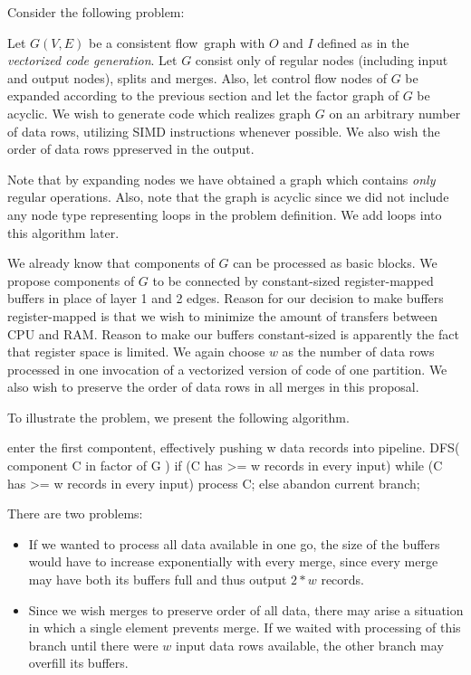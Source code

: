 Consider the following problem:

\begin{problem}
  Let $G(V,E)$ be a consistent flow~graph with $O$ and $I$ defined as in the \emph{vectorized code generation}. Let $G$ consist only of regular nodes (including input and output nodes), splits and merges.  Also, let control flow nodes of $G$ be expanded according to the previous section and let the factor graph of $G$ be acyclic. We wish to generate code which realizes graph $G$ on an arbitrary number of data rows, utilizing SIMD instructions whenever possible. We also wish the order of data rows ppreserved in the output.
\end{problem}

\begin{rem} 
Note that by expanding nodes we have obtained a graph which contains \emph{only} regular operations. Also, note that the graph is acyclic since we did not include any node type representing loops in the problem definition. We add loops into this algorithm later.
\end{rem}

We already know that components of $G$ can be processed as basic blocks. We propose components of $G$ to be connected by constant-sized register-mapped buffers in place of layer 1 and 2 edges. Reason for our decision to make buffers register-mapped is that we wish to minimize the amount of transfers between CPU and RAM. Reason to make our buffers constant-sized is apparently the fact that register space is limited. We again choose $w$ as the number of data rows processed in one invocation of a vectorized version of code of one partition. We also wish to preserve the order of data rows in all merges in this proposal.


To illustrate the problem, we present the following algorithm.

\begin{code}
enter the first compontent, 
  effectively pushing w data records into pipeline.
DFS( component C in factor of G )
{
  if (C has >= w records in every input)
    while (C has >= w records in every input)
      process C;
  else
    abandon current branch;
}
\end{code}

There are two problems:

\begin{itemize}
  \item If we wanted to process all data available in one go, the size of the buffers would have to increase exponentially with every merge, since every merge may have both its buffers full and thus output $2*w$ records.
  \item Since we wish merges to preserve order of all data, there may arise a situation in which a single element prevents merge. If we waited with processing of this branch until there were $w$ input data rows available, the other branch may overfill its buffers.
\end{itemize}

